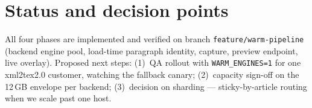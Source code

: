 \documentclass[10pt]{article}
\begin{document}
\section*{Status and decision points}

All four phases are implemented and verified on branch
\texttt{feature/warm-pipeline} (backend engine pool, load-time
paragraph identity, capture, preview endpoint, live overlay). Proposed
next steps: (1)~QA rollout with \texttt{WARM\_ENGINES=1} for one
xml2tex2.0 customer, watching the fallback canary; (2)~capacity sign-off
on the 12\,GB envelope per backend; (3)~decision on sharding ---
sticky-by-article routing when we scale past one host.
\end{document}
